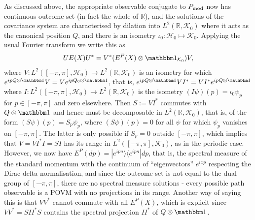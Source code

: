 As discussed above, the appropriate observable conjugate to $P_{\mathrm{mod}}$ now has continuous outcome set (in fact the whole of $\mathbb R$), and the solutions of the covariance system are characterised by dilation into $L^2(\mathbb R, \mathcal K_0)$ where it acts as the canonical position $Q$, and there is an isometry $\iota_0:\mathcal H_0\mapsto \mathcal K_0$. Applying the usual Fourier transform we write this as 
\begin{align}
UE(X)U^* = V^* (E^P(X)\otimes \id_{\mathcal K_0})V,
\end{align}
where $V:L^2([-\pi,\pi], \mathcal H_0)\to L^2(\mathbb R, \mathcal K_0)$ is an isometry for which $e^{ip Q\otimes \id}V=Ve^{ipQ_0\otimes \id}$, that is, $e^{ip Q\otimes \id}VI^* =VI^*e^{ipQ\otimes \id}$ where $I:L^2([-\pi,\pi], \mathcal H_0)\to L^2(\mathbb R, \mathcal K_0)$ is the isometry $(I\psi)(p) = \iota_0\psi_p$ for $p\in [-\pi,\pi]$ and zero elsewhere. Then $S:=VI^*$ commutes with $Q\otimes \id$ and hence must be decomposable in $L^2(\mathbb R,\mathcal K_0)$, that is, of the form $(S\psi)(p) = S_p\psi_p$, where $(S\psi)(p)=0$ for all $\psi$ for which $\psi_p$ vanishes on $[-\pi,\pi]$. The latter is only possible if $S_p=0$ outside $[-\pi,\pi]$, which implies that $V = VI^*I = SI$ has its range in $L^2([-\pi,\pi], \mathcal K_0)$, as in the periodic case. However, we now have $E^P(dp)=|e^{ipn}\rangle\langle e^{ipn}| dp$, that is, the spectral measure of the standard momentum with the continuum of ``eigenvectors'' $e^{ixp}$ respecting the Dirac delta normalisation, and since the outcome set is not equal to the dual group of $[-\pi,\pi]$, there are no spectral measure solutions - every possible path observable is a POVM with no projections in its range. Another way of saying this is that $VV^*$ cannot commute with all $E^P(X)$, which is explicit since $VV^*=SII^*S$ contains the spectral projection $II^*$ of $Q\otimes \id$.

